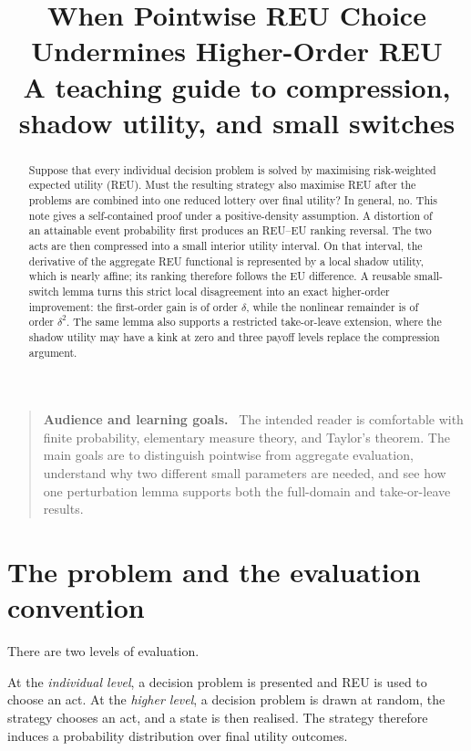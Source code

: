 \documentclass[11pt,a4paper]{article}
\title{When Pointwise REU Choice Undermines Higher-Order REU\\
\large A teaching guide to compression, shadow utility, and small switches}
\author{}
\date{}
\theoremstyle{definition}
\newenvironment{learninggoals}
  {\begin{quote}\color{MidnightBlue}\textbf{Audience and learning goals.}\ }
  {\end{quote}}
\begin{document}
\maketitle

\begin{abstract}
Suppose that every individual decision problem is solved by maximising
risk-weighted expected utility (REU). Must the resulting strategy also
maximise REU after the problems are combined into one reduced lottery over
final utility? In general, no. This note gives a self-contained proof under a
positive-density assumption. A distortion of an attainable event probability
first produces an REU--EU ranking reversal. The two acts are then compressed
into a small interior utility interval. On that interval, the derivative of
the aggregate REU functional is represented by a local shadow utility, which
is nearly affine; its ranking therefore follows the EU difference. A reusable
small-switch lemma turns this strict local disagreement into an exact
higher-order improvement: the first-order gain is of order $\delta$, while the
nonlinear remainder is of order $\delta^2$. The same lemma also supports a
restricted take-or-leave extension, where the shadow utility may have a kink
at zero and three payoff levels replace the compression argument.
\end{abstract}

\begin{learninggoals}
The intended reader is comfortable with finite probability, elementary
measure theory, and Taylor's theorem. The main goals are to distinguish
pointwise from aggregate evaluation, understand why two different small
parameters are needed, and see how one perturbation lemma supports both the
full-domain and take-or-leave results.
\end{learninggoals}

\tableofcontents

\section{The problem and the evaluation convention}

There are two levels of evaluation.

At the \emph{individual level}, a decision problem is presented and REU is
used to choose an act. At the \emph{higher level}, a decision problem is drawn
at random, the strategy chooses an act, and a state is then realised. The
strategy therefore induces a probability distribution over final utility
outcomes.
\end{document}
